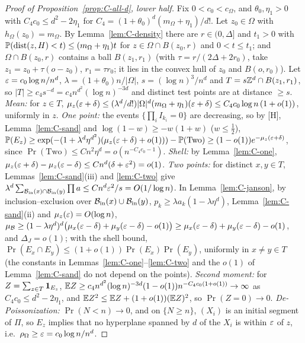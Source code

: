 \begin{proof}[Proof of Proposition~\ref{prop:C-all-d}, lower half]
Fix $0 < c_0 < c_\Omega$, and $\theta_0, \eta_1 > 0$ with $C_4c_0 \le d^2 - 2\eta_1$ for $C_4 = (1 + \theta_0)^d(m_\Omega + \eta_1)/d!$. Let
$z_0 \in \Omega$ with $h_\Omega(z_0) = m_\Omega$. By Lemma~\ref{lem:C-density} there are $r \in (0, \Delta]$ and $t_1 > 0$ with
$\mathbb{P}(\operatorname{dist}(z, H) < t) \le (m_\Omega + \eta_1)t$ for $z \in \Omega \cap B(z_0, r)$ and $0 < t \le t_1$; and $\Omega \cap B(z_0, r)$ contains a ball
$B(z_1, r_1)$ (with $\tau = r/(2\Delta + 2r_0)$, take $z_1 = z_0 + \tau(o - z_0)$, $r_1 = \tau r_0$; it lies in the convex hull of $z_0$ and
$B(o, r_0)$). Let $\varepsilon = c_0\log n/n^d$, $\lambda = (1 + \theta_0)n/|\Omega|$, $s = (\log n)^3/n^d$ and $T = s\mathbb{Z}^d \cap B(z_1, r_1)$, so
$|T| \ge c_4s^{-d} = c_4n^{d^2}(\log n)^{-3d}$ and distinct test points are at distance $\ge s$.
\emph{Mean:} for $z \in T$, $\mu_z(\varepsilon + \delta) \le (\lambda^d/d!)|\Omega|^d(m_\Omega + \eta_1)(\varepsilon + \delta) \le C_4c_0\log n\,(1 + o(1))$, uniformly in $z$.
\emph{One point:} the events $\{\prod_iI_{k_i} = 0\}$ are decreasing, so by [H], Lemma~\ref{lem:C-sand} and
$\log(1 - w) \ge -w(1 + w)$ ($w \le \frac12$),
$\mathbb{P}(E_z) \ge \exp(-(1 + \lambda^d\eta^{d^2})(\mu_z(\varepsilon + \delta) + o(1))) - \mathbb{P}(\mathrm{Two}) \ge (1 - o(1))e^{-\mu_z(\varepsilon + \delta)}$, since
$\Pr(\mathrm{Two}) \le Cn^2\eta^d = o(n^{-C_4c_0-1})$.
\emph{Shell:} by Lemma~\ref{lem:C-one}, $\mu_z(\varepsilon + \delta) - \mu_z(\varepsilon - \delta) \le Cn^d(\delta + \varepsilon^2) = o(1)$.
\emph{Two points:} for distinct $x, y \in T$, Lemmas~\ref{lem:C-sand}(iii) and \ref{lem:C-two} give
$\lambda^d\sum_{\mathcal{B}_{\mathrm{in}}(x) \cap \mathcal{B}_{\mathrm{in}}(y)}\prod a \le Cn^d\varepsilon^2/s = O(1/\log n)$. In Lemma~\ref{lem:C-janson},
by inclusion--exclusion over $\mathcal{B}_{\mathrm{in}}(x) \cup \mathcal{B}_{\mathrm{in}}(y)$, $p_k \ge \lambda a_k(1 - \lambda\eta^d)$, Lemma~\ref{lem:C-sand}(ii) and
$\mu_z(\varepsilon) = O(\log n)$,
$\mu_{\mathcal{B}} \ge (1 - \lambda\eta^d)^d\bigl(\mu_x(\varepsilon - \delta) + \mu_y(\varepsilon - \delta) - o(1)\bigr) \ge \mu_x(\varepsilon - \delta) + \mu_y(\varepsilon - \delta) - o(1)$,
and $\Delta_J = o(1)$; with the shell bound, $\Pr(E_x \cap E_y) \le (1 + o(1))\Pr(E_x)\Pr(E_y)$, uniformly in $x \ne y \in T$
(the constants in Lemmas~\ref{lem:C-one}--\ref{lem:C-two} and the $o(1)$ of Lemma~\ref{lem:C-sand} do not depend on the points).
\emph{Second moment:} for $Z = \sum_{z \in T}\mathbf{1}_{E_z}$, $\mathbb{E} Z \ge c_4n^{d^2}(\log n)^{-3d}(1 - o(1))n^{-C_4c_0(1 + o(1))} \to \infty$ as
$C_4c_0 \le d^2 - 2\eta_1$, and $\mathbb{E} Z^2 \le \mathbb{E} Z + (1 + o(1))(\mathbb{E} Z)^2$, so $\Pr(Z = 0) \to 0$.
\emph{De-Poissonization:} $\Pr(N < n) \to 0$, and on $\{N \ge n\}$, $(X_i)$ is an initial segment of $\Pi$, so $E_z$ implies
that no hyperplane spanned by $d$ of the $X_i$ is within $\varepsilon$ of $z$, i.e.\ $\rho_\Omega \ge \varepsilon = c_0\log n/n^d$.
\end{proof}

